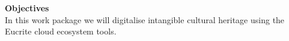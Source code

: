 \textbf{Objectives}\\
In this work package we will digitalise intangible cultural heritage using the Eucrite cloud ecosystem tools.
\par

